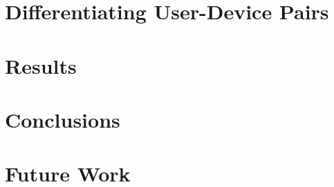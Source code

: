 \documentclass{acm_proc_article-sp}
\begin{document}
\section{Differentiating User-Device Pairs}
\label{sec:differentiation}


\section{Results}
\label{sec:results}



\section{Conclusions}
\label{sec:conclusions}


\section{Future Work}
\label{sec:futurework}



\end{document}
